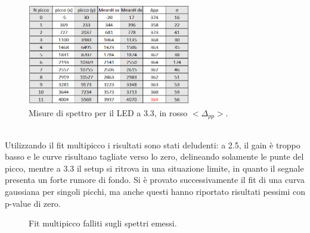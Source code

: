 \documentclass[11pt]{article} %
\begin{document}
\begin{figure}[h!]
\begin{center}
\includegraphics[width=270px]{img/tab33.png}
\caption{Misure di spettro per il LED a 3.3, in rosso $<\!\!\Delta_{pp}\!\!>$.}
\label{fig:Sipm33}
\end{center}
\end{figure}
\\Utilizzando il fit multipicco i risultati sono stati deludenti: a 2.5, il gain è troppo basso e le curve risultano tagliate verso lo zero, delineando solamente le punte del picco, mentre a 3.3 il setup si ritrova in una situazione limite, in quanto il segnale presenta un forte rumore di fondo. Si è provato successivamente il fit di una curva gaussiana per singoli picchi, ma anche questi hanno riportato risultati pessimi con p-value di zero.
\begin{figure}[!h]
\centering
\caption{Fit multipicco falliti sugli spettri emessi.}
\end{figure}
\end{document}
